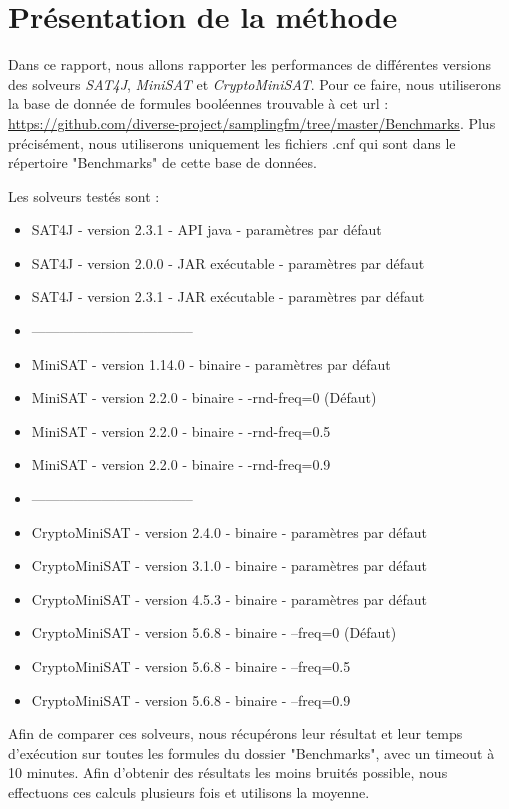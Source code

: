 \documentclass[11pt,a4paper]{article}
\author{Théo Gouzien - Théo Losekoot}
\begin{document}
\section{Présentation de la méthode}

Dans ce rapport, nous allons rapporter les performances de différentes versions des solveurs \textit{SAT4J}, \textit{MiniSAT} et \textit{CryptoMiniSAT}.
Pour ce faire, nous utiliserons la base de donnée de formules booléennes trouvable à cet url : \url{https://github.com/diverse-project/samplingfm/tree/master/Benchmarks}.
Plus précisément, nous utiliserons uniquement les fichiers .cnf qui sont dans le répertoire "Benchmarks" de cette base de données.

Les solveurs testés sont : 
\begin{itemize}
\item SAT4J - version 2.3.1 - API java - paramètres par défaut
\item SAT4J - version 2.0.0 - JAR exécutable - paramètres par défaut
\item SAT4J - version 2.3.1 - JAR exécutable - paramètres par défaut 
\item -----------------------------------
\item MiniSAT - version 1.14.0 - binaire - paramètres par défaut
\item MiniSAT - version 2.2.0  - binaire - -rnd-freq=0 (Défaut)
\item MiniSAT - version 2.2.0  - binaire - -rnd-freq=0.5
\item MiniSAT - version 2.2.0  - binaire - -rnd-freq=0.9
\item -----------------------------------
\item CryptoMiniSAT - version 2.4.0 - binaire - paramètres par défaut
\item CryptoMiniSAT - version 3.1.0 - binaire - paramètres par défaut
\item CryptoMiniSAT - version 4.5.3 - binaire - paramètres par défaut
\item CryptoMiniSAT - version 5.6.8 - binaire - --freq=0 (Défaut)
\item CryptoMiniSAT - version 5.6.8 - binaire - --freq=0.5
\item CryptoMiniSAT - version 5.6.8 - binaire - --freq=0.9
\end{itemize}

Afin de comparer ces solveurs, nous récupérons leur résultat et leur temps d'exécution sur toutes les formules du dossier "Benchmarks", avec un timeout à 10 minutes. 
Afin d'obtenir des résultats les moins bruités possible, nous effectuons ces calculs plusieurs fois et utilisons la moyenne.
\end{document}
